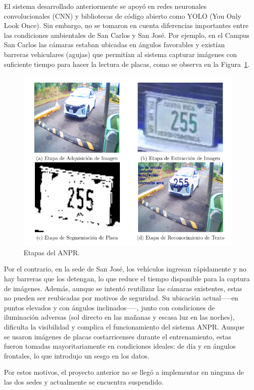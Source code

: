 El sistema desarrollado anteriormente se apoyó en redes neuronales convolucionales (CNN)
y bibliotecas de código abierto como YOLO (You Only Look Once). Sin embargo,
no se tomaron en cuenta diferencias importantes entre las condiciones ambientales de San Carlos y San José.
Por ejemplo, en el Campus San Carlos las cámaras estaban ubicadas en ángulos favorables y
existían barreras vehiculares (agujas) que permitían al sistema capturar imágenes con suficiente tiempo
para hacer la lectura de placas, como se observa en la Figura~\ref{fig:anpr san carlos camara}.

\begin{figure}[H]
	\centering
	\includegraphics[width=0.8\linewidth]{fig/proy/ANPR_san_carlos.png}
	\caption{Etapas del ANPR.}
	\label{fig:anpr san carlos camara}
\end{figure}

Por el contrario, en la sede de San José, los vehículos ingresan rápidamente y no hay barreras que los detengan,
lo que reduce el tiempo disponible para la captura de imágenes. Además,
aunque se intentó reutilizar las cámaras existentes, estas no pueden ser reubicadas por motivos de seguridad.
Su ubicación actual--—en puntos elevados y con ángulos inclinados—--,
junto con condiciones de iluminación adversas (sol directo en las mañanas y escasa luz en las noches),
dificulta la visibilidad y complica el funcionamiento del sistema ANPR.
Aunque se usaron imágenes de placas costarricenses durante el entrenamiento,
estas fueron tomadas mayoritariamente en condiciones ideales: de día y en ángulos frontales,
lo que introdujo un sesgo en los datos.

Por estos motivos, el proyecto anterior no se llegó a implementar en ninguna de las dos sedes 
y actualmente se encuentra suspendido.

